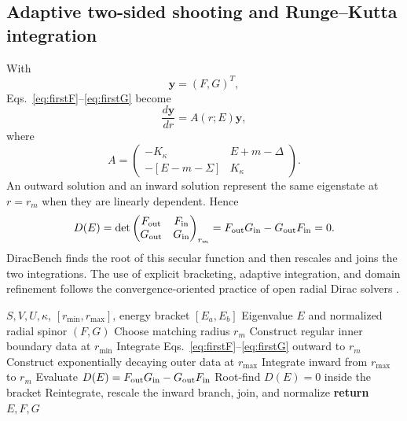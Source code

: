 \documentclass[a4paper,fleqn]{cas-dc}
\begin{document}
\subsection{Adaptive two-sided shooting and Runge--Kutta integration}
With
\begin{equation}
\mathbf y=(F,G)^T,
\end{equation}
Eqs.~\eqref{eq:firstF}--\eqref{eq:firstG} become
\begin{equation}
\frac{d\mathbf y}{dr}=A(r;E)\mathbf y,
\end{equation}
where
\begin{equation}
A=
\begin{pmatrix}
-K_\kappa & E+m-\Delta\\
-[E-m-\Sigma] & K_\kappa
\end{pmatrix}.
\end{equation}
An outward solution and an inward solution represent the same eigenstate at
$r=r_m$ when they are linearly dependent. Hence
\begin{equation}
D(E)=
\det
\begin{pmatrix}
F_{\rm out}&F_{\rm in}\\
G_{\rm out}&G_{\rm in}
\end{pmatrix}_{r_m}
=
F_{\rm out}G_{\rm in}-G_{\rm out}F_{\rm in}=0.
\end{equation}
DiracBench finds the root of this secular function and then rescales and joins
the two integrations. The use of explicit bracketing, adaptive integration, and
domain refinement follows the convergence-oriented practice of open radial
Dirac solvers \cite{Certik2013,Hairer1993}.


\begin{algorithm}[t]
\caption{Adaptive two-sided shooting for one radial Dirac state}
\label{alg:shooting}
\begin{algorithmic}[1]
\Require $S,V,U,\kappa$, $[r_{\min},r_{\max}]$, energy bracket $[E_a,E_b]$
\Ensure Eigenvalue $E$ and normalized radial spinor $(F,G)$
\State Choose matching radius $r_m$
\State Construct regular inner boundary data at $r_{\min}$
\State Integrate Eqs.~\eqref{eq:firstF}--\eqref{eq:firstG} outward to $r_m$
\State Construct exponentially decaying outer data at $r_{\max}$
\State Integrate inward from $r_{\max}$ to $r_m$
\State Evaluate $D(E)=F_{\rm out}G_{\rm in}-G_{\rm out}F_{\rm in}$
\EndFor
\State Root-find $D(E)=0$ inside the bracket
\State Reintegrate, rescale the inward branch, join, and normalize
\State \textbf{return} $E,F,G$
\end{algorithmic}
\end{algorithm}
\end{document}

